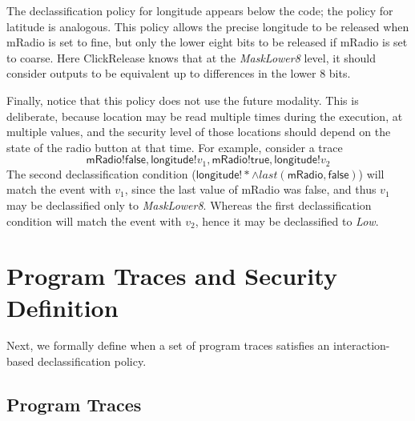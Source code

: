 \documentclass{llncs}
\newcommand{\code}[1]{\textsf{#1}} %
\newcommand{\toolname}{ClickRelease\xspace}
\newcommand{\tlast}[2]{\textit{last}(#1, #2)}
\begin{document}
The declassification policy for longitude appears below the code; the
policy for latitude is analogous.  This policy allows the precise
longitude to be released when
\code{mRadio} is set to fine, but only the lower eight bits to
be released if \code{mRadio} is set to coarse. Here \toolname{}
knows that at the \textit{MaskLower8} level, it should consider
outputs to be equivalent up to differences in the lower 8
bits. 

Finally, notice that this policy does not use the future
modality. This is deliberate, because location may be read multiple
times during the execution, at multiple values, and the security level
of those locations should depend on the state of the
radio button at that time. For example, consider a trace
\begin{displaymath}
  \code{mRadio!false}, \code{longitude!}v_1,
  \code{mRadio!true}, \code{longitude!}v_2
\end{displaymath}
The second declassification condition ($\code{longitude}!\ast \wedge
\tlast{\code{mRadio}}{\code{false}}$) will match the event with $v_1$, since
the last value of \code{mRadio} was \code{false}, and
thus $v_1$ may be declassified only to \textit{MaskLower8}. Whereas
the first declassification condition will match the event with $v_2$, hence it
may be declassified to \textit{Low}.

\section{Program Traces and Security Definition}
\label{sec:formalism}

Next, we formally define when a set of program traces satisfies an
interaction-based declassification policy.

\subsection{Program Traces}
\label{sec:traces}
\end{document}
